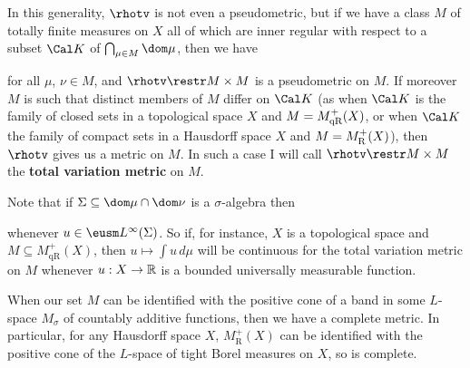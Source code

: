 \noindent In this generality, $\rhotv$
is not even a pseudometric, but if we
have a class $M$ of totally finite measures on $X$ all of which are inner
regular with respect to a subset $\Cal K$ of $\bigcap_{\mu\in M}\dom\mu$,
then we have


\noindent for all $\mu$, $\nu\in M$, and $\rhotv\restr M\times M$ is a
pseudometric on $M$.   If moreover $M$ is such that distinct members of $M$
differ on $\Cal K$ (as when $\Cal K$ is the family of
closed sets in a topological space $X$ and $M=M^+_{\text{qR}}(X)$, or when
$\Cal K$ the family of compact sets in a Hausdorff space $X$ and
$M=M^+_{\text{R}}(X)$), then $\rhotv$
gives us a metric on $M$.   In such a case I will call
$\rhotv\restr M\times M$ the {\bf total variation metric} on $M$.

\medskip

 Note that if $\Sigma\subseteq\dom\mu\cap\dom\nu$
is a $\sigma$-algebra then


\noindent whenever $u\in\eusm L^{\infty}(\Sigma)$.   So if, for instance,
$X$ is a topological space and $M\subseteq M^+_{\text{qR}}(X)$, then
$u\mapsto\int u\,d\mu$ will be continuous for the total variation metric on
$M$ whenever $u:X\to\Bbb R$ is a bounded universally measurable function.

\medskip

   When our set $M$ can be identified with the positive cone
of a band in some $L$-space
$M_{\sigma}$ of countably additive functions, then
we
have a complete metric.   In particular, for any Hausdorff space $X$,
$M^+_{\text{R}}(X)$ can be identified with the
positive cone of the $L$-space of tight Borel measures on $X$, so is
complete.    


